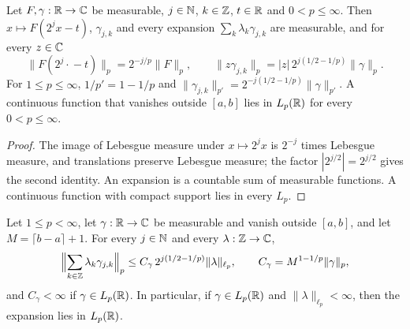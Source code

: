 \begin{lemma}
\label{lem:daub-generator-norms}
\leanok
{}
Let $F, \gamma : \mathbb{R} \to \mathbb{C}$ be measurable, $j \in \mathbb{N}$, $k \in \mathbb{Z}$, $t \in \mathbb{R}$ and
$0 < p \leq \infty$. Then $x \mapsto F(2^j x - t)$, $\gamma_{j,k}$ and every expansion
$\sum_k \lambda_k \gamma_{j,k}$ are measurable, and for every $z \in \mathbb{C}$
\[
  \|F(2^j \cdot {} - t)\|_p = 2^{-j/p} \|F\|_p , \qquad
  \|z \gamma_{j,k}\|_p = |z| \, 2^{j(1/2 - 1/p)} \|\gamma\|_p .
\]
For $1 \leq p \leq \infty$, $1/p' = 1 - 1/p$ and
$\|\gamma_{j,k}\|_{p'} = 2^{-j(1/2 - 1/p)} \|\gamma\|_{p'}$. A continuous function that vanishes
outside $[a, b]$ lies in $L_p(\mathbb{R})$ for every $0 < p \leq \infty$.
\end{lemma}

\begin{proof}
\leanok
The image of Lebesgue measure under $x \mapsto 2^j x$ is $2^{-j}$ times Lebesgue measure, and
translations preserve Lebesgue measure; the factor $|2^{j/2}| = 2^{j/2}$ gives the second
identity. An
expansion is a countable sum of measurable functions. A continuous function with compact support
lies in every $L_p$.
\end{proof}

\begin{theorem}
\label{thm:daub-upper-stability}
\leanok
{}
Let $1 \leq p < \infty$, let $\gamma : \mathbb{R} \to \mathbb{C}$ be measurable and vanish outside $[a, b]$, and
let $M = \lceil b - a \rceil + 1$. For every $j \in \mathbb{N}$ and every $\lambda : \mathbb{Z} \to \mathbb{C}$,
\[
  \Bigl\|\sum_{k \in \mathbb{Z}} \lambda_k \gamma_{j,k}\Bigr\|_p
  \leq C_\gamma \, 2^{j(1/2 - 1/p)} \|\lambda\|_{\ell_p} , \qquad
  C_\gamma = M^{1 - 1/p} \|\gamma\|_p ,
\]
and $C_\gamma < \infty$ if $\gamma \in L_p(\mathbb{R})$. In particular, if $\gamma \in L_p(\mathbb{R})$ and
$\|\lambda\|_{\ell_p} < \infty$, then the expansion lies in $L_p(\mathbb{R})$.
\end{theorem}

